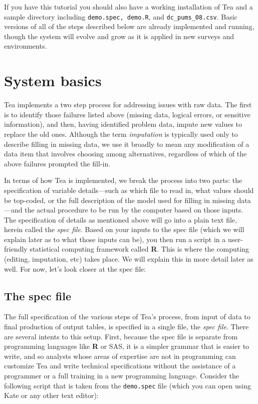 \documentclass{article}
\begin{document}
If you have this tutorial you should also have a working installation of Tea and 
a sample directory including {\tt demo.spec, demo.R}, and {\tt dc\_pums\_08.csv}. 
Basic versions of all of the steps described below are already implemented and running,
though the system will evolve and grow as it is applied in new surveys and environments.

\section{System basics}\label{basicssec}
Tea implements a two step process for addressing issues with raw data. The first is to
identify those failures listed above (missing data, logical errors, or sensitive
information), and then, having identified problem data, impute new values
to replace the old ones. Although the term {\em imputation} is typically used only to 
describe filling in missing data, we use it broadly to mean any modification of a 
data item that involves choosing among alternatives, regardless of which of the 
above failures prompted the fill-in. 

In terms of how Tea is implemented, we break the process into two parts: the 
specification of variable details---such as which file to read in, what values should 
be top-coded, or the full description of the model used for filling in missing 
data---and the actual procedure to be run by the computer based on those inputs. 
The specification of details as mentioned above will go into a plain text file, 
herein called the {\em spec file}. Based on your inputs to the spec file 
(which we will explain later as to what those inputs can be), you then run 
a script in a user-friendly statistical computing framework called {\bf R}. This is 
where the computing (editing, imputation, etc) takes place. We will explain this in 
more detail later as well. For now, let's look closer at the spec file: 

\subsection{The spec file}\label{specsec}
The full specification of the various steps of Tea's process, from input of data to final 
production of output tables, 
is specified in a single file, the {\em spec file}. There are several intents to 
this setup. First, because the spec file is separate from programming languages like
\textbf{R} or SAS, it is a simpler grammar that is easier to write, and so analysts
whose areas of expertise are not in programming can customize Tea and write technical
specifications without the assistance of a programmer or a full training in a new
programming language. Consider the following script that
is taken from the {\tt demo.spec} file (which you can open using Kate or any other
text editor):
\end{document}
